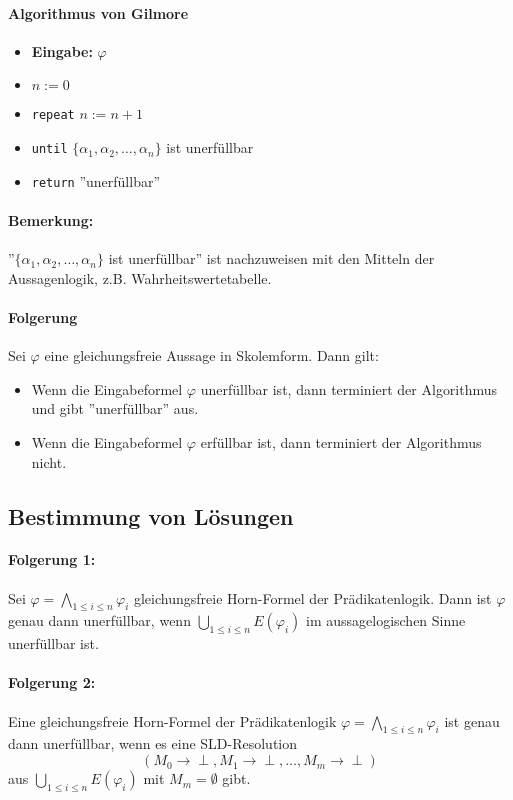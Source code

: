 \documentclass[12pt,a4paper]{report}
\newcommand{\ra}{\rightarrow}
\newcommand{\green}[1]{\textcolor[rgb]{0.1,0.6,0.1}{#1}}
\begin{document}
\paragraph{Algorithmus von Gilmore}
\begin{itemize}
    \item[] \textbf{Eingabe:} $ \varphi $
    \item[] $ n:=0 $
    \item[] \texttt{repeat} $ n:= n+1 $
    \item[] \texttt{until} $ \{ \alpha_1,\alpha_2,\dots,\alpha_n \} $ ist unerfüllbar
    \item[] \texttt{return} ''unerfüllbar''
\end{itemize}
\paragraph{Bemerkung:} ''$ \{ \alpha_1,\alpha_2,\dots,\alpha_n \} $ ist unerfüllbar'' ist nachzuweisen mit den Mitteln der Aussagenlogik, z.B. Wahrheitswertetabelle.

\paragraph{Folgerung}
Sei $ \varphi $ eine gleichungsfreie Aussage in Skolemform. Dann gilt:
\begin{itemize}
    \item Wenn die Eingabeformel $ \varphi $ unerfüllbar ist, dann terminiert der Algorithmus und gibt ''unerfüllbar'' aus.
    \item Wenn die Eingabeformel $ \varphi $ erfüllbar ist, dann terminiert der Algorithmus nicht.
\end{itemize}
\subsection{\green{Bestimmung von Lösungen}}
\paragraph{Folgerung 1:} Sei $ \varphi = \bigwedge_{1 \leq i \leq n} \varphi_i $ gleichungsfreie Horn-Formel der Prädikatenlogik. Dann ist $ \varphi $ genau dann unerfüllbar, wenn $ \bigcup_{1 \leq i \leq n} E(\varphi_i)$ im aussagelogischen Sinne unerfüllbar ist.
\paragraph{Folgerung 2:} Eine gleichungsfreie Horn-Formel der Prädikatenlogik $ \varphi = \bigwedge_{1 \leq i \leq n} \varphi_i $ ist genau dann unerfüllbar, wenn es eine SLD-Resolution
\[
    (M_0 \ra \perp, M_1 \ra \perp,\dots, M_m \ra \perp)
\]
aus $ \bigcup_{1 \leq i \leq n}E(\varphi_i) $ mit $ M_m = \emptyset $ gibt.
\end{document}
